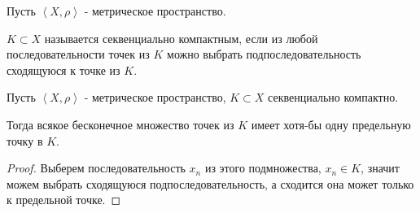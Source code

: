 
\begin{definition} \thmslashn 

    Пусть $\left<X, \rho\right>$ - метрическое пространство.

    $K \subset X$ называется секвенциально компактным, если из любой последовательности точек из $K$ можно выбрать подпоследовательность сходящуюся к точке из $K$.
\end{definition}
\begin{theorem} \thmslashn

    Пусть $\left<X, \rho\right>$ - метрическое пространство, $K \subset X$ секвенциально компактно.

    Тогда всякое бесконечное множество точек из $K$ имеет хотя-бы одну предельную точку в $K$.
    \begin{proof} \thmslashn
    
        Выберем последовательность $x_{n}$ из этого подмножества, $x_{n}\in K$, значит можем выбрать сходящуюся подпоследовательность, а сходится она может только к предельной точке.
    \end{proof}
\end{theorem}
